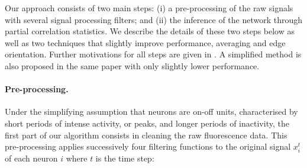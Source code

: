 \documentclass[wcp]{jmlr}
\begin{document}
Our approach consists of two main steps: (i) a pre-processing of the raw
signals with several signal processing filters; and (ii) the inference of the
network through partial correlation statistics. We describe the details of
these two steps below as well as two techniques that slightly improve
performance, averaging and edge orientation. Further motivations for all steps
are given in \citep{sutera2014simple}. A simplified method is also proposed in
the same paper with only slightly lower performance.

\paragraph{Pre-processing.}

Under the simplifying assumption that neurons are on-off units, characterised
by short periods of intense activity, or peaks, and longer periods of
inactivity, the first part of our algorithm consists in cleaning the raw
fluorescence data. This pre-processing applies successively four
filtering functions to the original signal $x^t_i$ of each neuron $i$ where $t$ is the time step:
\end{document}
